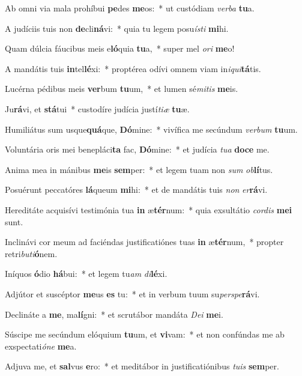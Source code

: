 \item Ab omni via mala prohíbui \textbf{pe}des \textbf{me}os:~* ut custódiam \textit{ver}\textit{ba} \textbf{tu}a.
\item A judíciis tuis non \textbf{de}cli\textbf{ná}vi:~* quia tu legem posu\textit{ís}\textit{ti} \textbf{mi}hi.
\item Quam dúlcia fáucibus meis e\textbf{ló}quia \textbf{tu}a,~* super mel \textit{o}\textit{ri} \textbf{me}o!
\item A mandátis tuis \textbf{in}tel\textbf{lé}xi:~* proptérea odívi omnem viam in\textit{i}\textit{qui}\textbf{tá}tis.
\item Lucérna pédibus meis \textbf{ver}bum \textbf{tu}um,~* et lumen sé\textit{mi}\textit{tis} \textbf{me}is.
\item Ju\textbf{rá}vi, et \textbf{stá}tui~* custodíre judícia justí\textit{ti}\textit{æ} \textbf{tu}æ.
\item Humiliátus sum usque\textbf{quá}que, \textbf{Dó}mine:~* vivífica me secúndum \textit{ver}\textit{bum} \textbf{tu}um.
\item Voluntária oris mei benepláci\textbf{ta} fac, \textbf{Dó}mine:~* et judícia \textit{tu}\textit{a} \textbf{do}\textbf{ce} me.
\item Anima mea in mánibus \textbf{me}is \textbf{sem}per:~* et legem tuam non \textit{sum} \textit{ob}\textbf{lí}tus.
\item Posuérunt peccatóres \textbf{lá}queum \textbf{mi}hi:~* et de mandátis tuis \textit{non} \textit{er}\textbf{rá}vi.
\item Hereditáte acquisívi testimónia tua \textbf{in} æ\textbf{tér}num:~* quia exsultátio \textit{cor}\textit{dis} \textbf{me}\textbf{i} sunt.
\item Inclinávi cor meum ad faciéndas justificatiónes tuas \textbf{in} æ\textbf{tér}num,~* propter retri\textit{bu}\textit{ti}\textbf{ó}nem.
\item Iníquos \textbf{ó}dio \textbf{há}bui:~* et legem tu\textit{am} \textit{di}\textbf{lé}xi.
\item Adjútor et suscéptor \textbf{me}us \textbf{es} tu:~* et in verbum tuum su\textit{per}\textit{spe}\textbf{rá}vi.
\item Declináte a \textbf{me}, ma\textbf{lí}gni:~* et scrutábor mandáta \textit{De}\textit{i} \textbf{me}i.
\item Súscipe me secúndum elóquium \textbf{tu}um, et \textbf{vi}vam:~* et non confúndas me ab exspectati\textit{ó}\textit{ne} \textbf{me}a.
\item Adjuva me, et \textbf{sal}vus \textbf{e}ro:~* et meditábor in justificatiónibus \textit{tu}\textit{is} \textbf{sem}per.
